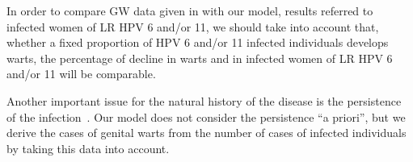 In order to compare GW data given in \cite{Ali} with our model, results referred to infected women of LR HPV 6 and/or 11, we should take into account that, whether a fixed proportion of HPV 6 and/or 11 infected individuals develops warts, the percentage of decline in warts and in infected women of LR HPV 6 and/or 11 will be comparable. 

Another important issue for the natural history of the disease is the persistence of the infection~\cite{AJE2014}. Our model does not consider the persistence ``a priori'', but we derive the cases of genital warts from the number of cases of infected individuals by taking this data into account.
